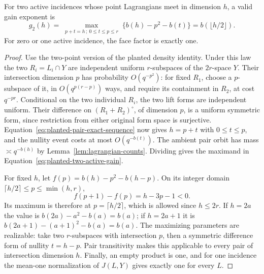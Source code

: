 \begin{lemma}\label{lem:two-active-gain}
For two active incidences whose point Lagrangians meet in dimension
$h$, a valid gain exponent is
\begin{equation}\label{eq:planted-two-active-gain}
 g_2(h)
 =\max_{\substack{p+t=h\,;\ 0\le t\le p\le r}}
      \{b(h)-p^2-b(t)\}
 =b(\lfloor h/2\rfloor).
\end{equation}
For zero or one active incidence, the face factor is exactly one.
\end{lemma}
\begin{proof}
Use the two-point version of the planted density identity.  Under
this law the two $R_i=L_i\cap Y$ are independent uniform
$r$-subspaces of the $2r$-space $Y$.  Their intersection dimension
$p$ has probability $O(q^{-p^2})$: for fixed $R_1$, choose a
$p$-subspace of it, in $O(q^{p(r-p)})$ ways, and require its
containment in $R_2$, at cost $q^{-pr}$.  Conditional on the two
individual $R_i$, the two lift forms are independent uniform.  Their
difference on $(R_1+R_2)^\circ$, of dimension $p$, is a uniform
symmetric form, since restriction from either original form space
is surjective.  Equation~\eqref{eq:planted-pair-exact-sequence}
now gives $h=p+t$ with $0\le t\le p$, and the nullity event costs
at most $O(q^{-b(t)})$.  The ambient pair orbit has mass
$\asymp q^{-b(h)}$ by Lemma~\ref{lem:lagrangian-counts}.  Dividing
gives the maximand in Equation~\eqref{eq:planted-two-active-gain}.

For fixed $h$, let $f(p)=b(h)-p^2-b(h-p)$.  On its integer domain
$\lceil h/2\rceil\le p\le\min(h,r)$,
\[
 f(p+1)-f(p)=h-3p-1<0.
\]
Its maximum is therefore at $p=\lceil h/2\rceil$, which is
allowed since $h\le2r$.  If $h=2a$ the value is
$b(2a)-a^2-b(a)=b(a)$; if $h=2a+1$ it is
$b(2a+1)-(a+1)^2-b(a)=b(a)$.  The maximizing parameters are
realizable: take two $r$-subspaces with intersection $p$, then a
symmetric difference form of nullity $t=h-p$.  Pair transitivity
makes this applicable to every pair of intersection dimension $h$.
Finally, an empty product is one, and for one incidence the mean-one
normalization of $J(L,Y)$ gives exactly one for every $L$.
\end{proof}

